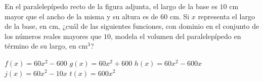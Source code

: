 \documentclass[
  titulo=Prueba,
  subtitulo=Álgebra y funciones,
  curso=Tercero medio B,
  fecha=2025-09-26,
  con nombre,
  ppp=1
]{srs3}
\begin{document}
\begin{preguntas}
\pregunta En el paralelepípedo recto de la figura adjunta, el largo de la base es \(10\) cm mayor que el ancho de la misma y su altura es de \(60\) cm.
Si \(x\) representa el largo de la base, en cm, ¿cuál de las siguientes funciones, con dominio en el conjunto de los números reales mayores que \(10\), modela el volumen del paralelepípedo en término de su largo, en cm\(^3\)?
\begin{columnas}[0.5][t]
\begin{alternativas}
\alternativa \( f\left(x\right)=60x^2-600 \)
\alternativa \( g\left(x\right)=60x^2+600 \)
\alternativa \( h\left(x\right)=60x^2-600x \)
\alternativa \( j\left(x\right)=60x^2-10x \)
\alternativa \( t\left(x\right)=600x^2 \)
\end{alternativas}
\siguiente
{}
\end{columnas}


\end{preguntas}
\end{document}
